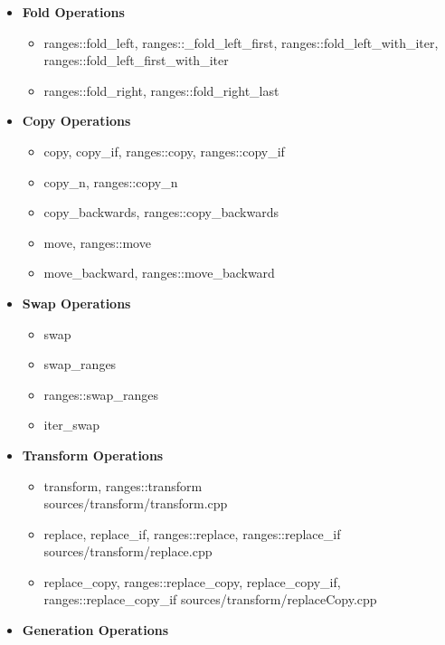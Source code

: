\documentclass{article}
\begin{document}
\begin{itemize}
        \item \textbf{Fold Operations}
          \begin{itemize}
            \item ranges::fold\_left, ranges::\_fold\_left\_first, ranges::fold\_left\_with\_iter, ranges::fold\_left\_first\_with\_iter
            \item ranges::fold\_right, ranges::fold\_right\_last
          \end{itemize}
        \item \textbf{Copy Operations}
          \begin{itemize}
            \item copy, copy\_if, ranges::copy, ranges::copy\_if
            \item copy\_n, ranges::copy\_n
            \item copy\_backwards, ranges::copy\_backwards
            \item move, ranges::move
            \item move\_backward, ranges::move\_backward
          \end{itemize}
        \item \textbf{Swap Operations}
          \begin{itemize}
            \item swap
            \item swap\_ranges
            \item ranges::swap\_ranges
            \item iter\_swap
          \end{itemize}
        \item \textbf{Transform Operations}
          \begin{itemize}
            \item transform, ranges::transform \\
               {sources/transform/transform.cpp}
            \item replace, replace\_if, ranges::replace, ranges::replace\_if
               {sources/transform/replace.cpp}
            \item replace\_copy, ranges::replace\_copy, replace\_copy\_if, ranges::replace\_copy\_if
               {sources/transform/replaceCopy.cpp}
          \end{itemize}
        \item \textbf{Generation Operations}
          \begin{itemize}

\end{itemize}
\end{itemize}
\end{document}
